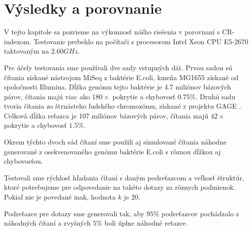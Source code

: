 \chapter{Výsledky a porovnanie}

V tejto kapitole sa pozrieme na výkonnosť nášho riešenia v porovnaní
s CR-indexom. Testovanie prebehlo na počítači s procesorom
Intel Xeon CPU E5-2670 taktovaným na $2.60 GHz$.

Pre účely testovania sme používali dve sady vstupných dát. Prvou sadou sú
čítania získané nástrojom MiSeq z baktérie E.coli, kmeňa MG1655
získané od spoločnosti Illumina. Dĺžka genómu tejto baktérie je 4.7 miliónov bázových párov, čítania
majú viac ako $180\times$ pokrytie a chybovosť $0.75\%$. Druhú sadu tvoria čítania zo štrnásteho ľudského
chromozómu, získané z projektu GAGE \cite{gage}. Celková dĺžka reťazca je 107 miliónov bázových párov,
čítania majú $42\times$ pokrytie a chybovosť $1.5\%$.

Okrem týchto dvoch sád čítaní sme použili aj simulované čítania náhodne generované z osekvenovaného
genómu baktérie E.coli s rôznou dĺžkou aj chybovosťou.

Testovali sme rýchlosť hľadania čítaní s daným podreťazcom a veľkosť štruktúr, ktoré potrebujeme pre odpovedanie
na takéto dotazy za rôznych podmienok. Pokiaľ nie je povedané inak, hodnota $k$ je $20$.

Podreťazce pre dotazy sme generovali tak, aby $95\%$ podreťazcov
pochádzalo z náhodných čítaní a zvyšných $5\%$ boli úplne náhodné reťazce.

